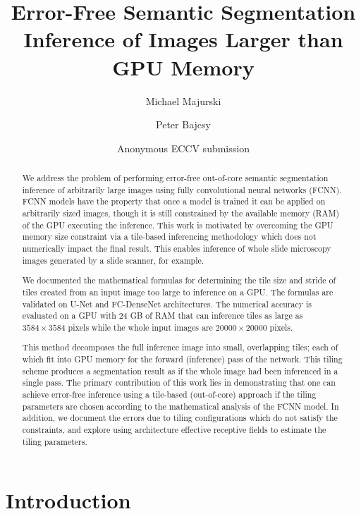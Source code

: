 \documentclass[runningheads]{llncs}
\title{Error-Free Semantic Segmentation Inference of Images Larger than GPU Memory}
\author{Michael Majurski\inst{1} \and Peter Bajcsy\inst{1}}
\institute{National Institute of Standards and Technology\\
	Information Technology Lab\\
	Gaithersburg, MD 20899, USA\\
	\email{\{michael.majurski,peter.bajcsy\}@nist.gov}}
\author{Anonymous ECCV submission}
\institute{Paper ID \ECCVSubNumber}
\begin{document}
\maketitle
 
\begin{abstract}

We address the problem of performing error-free out-of-core semantic segmentation inference of arbitrarily large images using fully convolutional neural networks (FCNN). FCNN models have the property that once a model is trained it can be applied on arbitrarily sized images, though it is still constrained by the available memory (RAM) of the GPU executing the inference. This work is motivated by overcoming the GPU memory size constraint via a tile-based inferencing methodology which does not numerically impact the final result. This enables inference of whole slide microscopy images generated by a slide scanner, for example.

We documented the mathematical formulas for determining the tile size and stride of tiles created from an input image too large to inference on a GPU. 
The formulas are validated on U-Net and FC-DenseNet architectures.
The numerical accuracy is evaluated on a GPU with 24 GB of RAM that can inference tiles as large as $\num{3584} \times \num{3584}$ pixels while the whole input images are $\num{20000} \times \num{20000}$ pixels. 

This method decomposes the full inference image into small, overlapping tiles; each of which fit into GPU memory for the forward (inference) pass of the network. 
This tiling scheme produces a segmentation result as if the whole image had been inferenced in a single pass. 
The primary contribution of this work lies in demonstrating that one can achieve error-free inference using a tile-based (out-of-core) approach if the tiling parameters are chosen according to the mathematical analysis of the FCNN model. 
In addition, we document the errors due to tiling configurations which do not satisfy the constraints, and explore using architecture effective receptive fields to estimate the tiling parameters. 

\end{abstract}

\section{Introduction}
\end{document}
